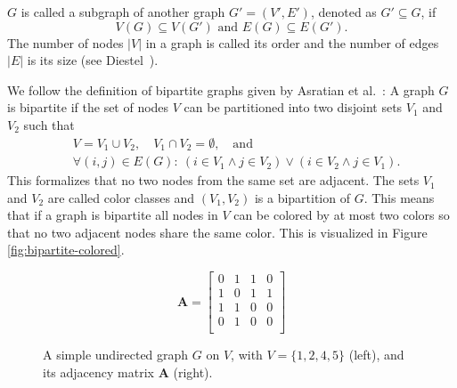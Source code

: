 $G$ is called a subgraph of another graph $G'=(V',E')$, denoted as $G' \subseteq G$, if 
\[
    V(G) \subseteq V(G') \text{ and } E(G) \subseteq E(G').
\]
The number of nodes $|V|$ in a graph is called its order and the number of edges $|E|$ is its size (see Diestel~\cite{Diestel2017}). \bigskip

We follow the definition of bipartite graphs given by Asratian et al.~\cite{asratian1998}: A graph $G$ is bipartite if the set of nodes $V$ can be partitioned into two disjoint sets $V_1$ and $V_2$ such that
\begin{align*}
    &V = V_1 \cup V_2,\quad V_1 \cap V_2 = \emptyset, \quad \text{and} \\
    &\forall (i,j) \in E(G):\ (i \in V_1 \land j \in V_2) \lor (i \in V_2 \land j \in V_1).
\end{align*}
This formalizes that no two nodes from the same set are adjacent. The sets $V_1$ and $V_2$ are called color classes and $(V_1, V_2)$ is a bipartition of $G$. This means that if a graph is bipartite all nodes in $V$ can be colored by at most two colors so that no two adjacent nodes share the same color. This is visualized in Figure \ref{fig:bipartite-colored}. \bigskip
\begin{figure}[h]
    \centering
    \begin{minipage}{0.5\textwidth}
        \centering
    \end{minipage}%
    \begin{minipage}{0.45\textwidth}
        \vspace*{0.1cm} %
        \[
        \mathbf{A} = \begin{bmatrix}
            0 & 1 & 1 & 0 \\
            1 & 0 & 1 & 1 \\
            1 & 1 & 0 & 0 \\
            0 & 1 & 0 & 0 \\
        \end{bmatrix}
        \]
    \end{minipage}
    \caption[Example of an undirected graph]{A simple undirected graph $G$ on $V$, with $V=\{1,2,4,5\}$ (left), and its adjacency matrix $\mathbf{A}$ (right).}
    \label{fig:graph-example}
\end{figure}

